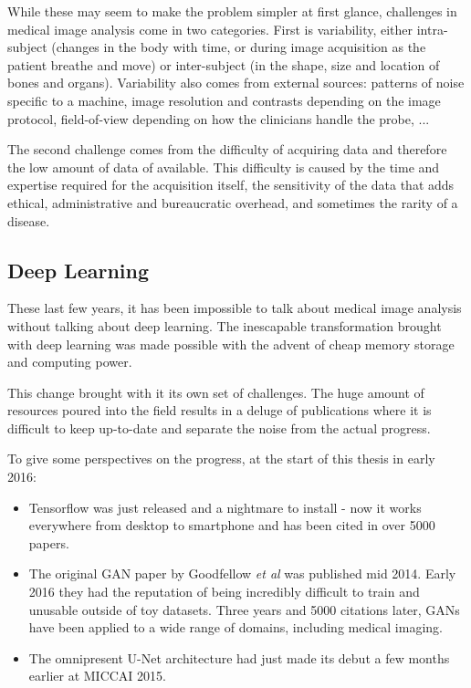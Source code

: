 While these may seem to make the problem simpler at first glance, challenges in medical image analysis come in two categories. First is variability, either intra-subject (changes in the body with time, or during image acquisition as the patient breathe and move) or inter-subject (in the shape, size and location of bones and organs). Variability also comes from external sources: patterns of noise specific to a machine, image resolution and contrasts depending on the image protocol, field-of-view depending on how the clinicians handle the probe, ... 

The second challenge comes from the difficulty of acquiring data and therefore the low amount of data of available. This difficulty is caused by the time and expertise required for the acquisition itself, the sensitivity of the data that adds ethical, administrative and bureaucratic overhead, and sometimes the rarity of a disease.

\subsection{Deep Learning}

These last few years, it has been impossible to talk about medical image analysis without talking about deep learning. The inescapable transformation brought with deep learning was made possible with the advent of cheap memory storage and computing power. %

This change brought with it its own set of challenges. The huge amount of resources poured into the field results in a deluge of publications where it is difficult to keep up-to-date and separate the noise from the actual progress.

To give some perspectives on the progress, at the start of this thesis in early 2016: 
\begin{itemize}
    \item Tensorflow was just released and a nightmare to install - now it works everywhere from desktop to smartphone and has been cited in over 5000 papers.
    \item The original GAN paper by Goodfellow \textit{et al} was published mid 2014. Early 2016 they had the reputation of being incredibly difficult to train and unusable outside of toy datasets. Three years and 5000 citations later, GANs have been applied to a wide range of domains, including medical imaging.
    \item The omnipresent U-Net architecture had just made its debut a few months earlier at MICCAI 2015.
\end{itemize}


